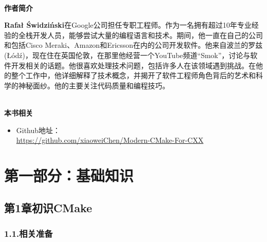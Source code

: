 \documentclass[11pt,a4paper,UTF8]{book}
\begin{document}
\begin{sloppypar}
	\hspace*{\fill} \\ %
	\noindent\textbf{作者简介}
	
	\textbf{Rafał Świdziński}在Google公司担任专职工程师。作为一名拥有超过10年专业经验的全栈开发人员，能够尝试大量的编程语言和技术。期间，他一直在自己的公司和包括Cisco Meraki、Amazon和Ericsson在内的公司开发软件。他来自波兰的罗兹(Łódź)，现在住在英国伦敦，在那里他经营一个YouTube频道“Smok”，讨论与软件开发相关的话题。他很喜欢处理技术问题，包括许多人在该领域遇到挑战。在他的整个工作中，他详细解释了技术概念，并揭开了软件工程师角色背后的艺术和科学的神秘面纱。他的主要关注代码质量和编程技巧。
	
	\hspace*{\fill} \\ %
	\noindent\textbf{本书相关}
	\begin{itemize}
		\item Github地址：\\\url{https://github.com/xiaoweiChen/Modern-CMake-For-CXX}
	\end{itemize}
	\newpage
	
	\pagestyle{empty}
	
	\newpage
	
	\tableofcontents
	\newpage

	
	\color{white}
	\section*{第一部分：基础知识}
	\pagecolor{mygray}
	\textbf{}
	\newpage
	\color{black}
	\pagecolor{white}

	\subsection*{ 第1章\hspace{0.5cm}初识CMake}
	
	
	\subsubsection*{ 1.1.\hspace{0.2cm}相关准备}
	
	

\end{sloppypar}
\end{document}

